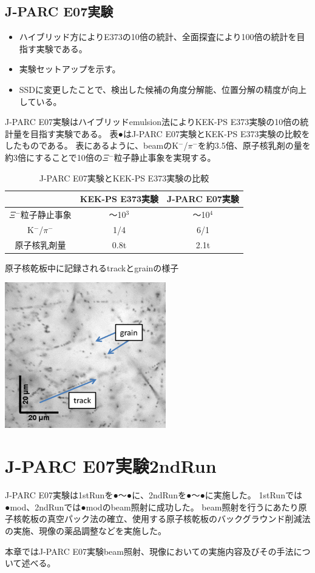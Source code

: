 \documentclass[12pt,a4paper]{jarticle}
\begin{document}
\subsection{J-PARC E07実験}
\begin{itemize}
    \item ハイブリッド方によりE373の10倍の統計、全面探査により100倍の統計を目指す実験である。
    \item 実験セットアップを示す。
    \item SSDに変更したことで、検出した候補の角度分解能、位置分解の精度が向上している。
\end{itemize}
J-PARC E07実験はハイブリッドemulsion法によりKEK-PS E373実験の10倍の統計量を目指す実験である。
表●はJ-PARC E07実験とKEK-PS E373実験の比較をしたものである。
表にあるように、beamのK$^-$/$\pi$$^-$を約3.5倍、原子核乳剤の量を約3倍にすることで10倍の$\Xi$$^-$粒子静止事象を実現する。
\begin{table}[htbp]
\centering
\caption{J-PARC E07実験とKEK-PS E373実験の比較\label{tab:compare_E07_E373}}
\begin{tabular}{c|c|c}
　　　&KEK-PS E373実験&J-PARC E07実験\\
\hline
\hline
$\Xi$$^-$粒子静止事象 & ～10$^3$    & ～10$^4$  \\
K$^-$/$\pi$$^-$ & 1/4  & 6/1 \\
原子核乳剤量 & 0.8t & 2.1t  \\
\hline
\end{tabular}
\end{table}
\begin{table}[htbp]
\centering
\caption{原子核乾板中に記録されるtrackとgrainの様子\label{tab:grain_track}}
\begin{center}
    \includegraphics[width=70mm]{grainfog.png}
\end{center}
\end{table}


\newpage
\section{J-PARC E07実験2ndRun}
J-PARC E07実験は1stRunを●～●に、2ndRunを●～●に実施した。
1stRunでは●mod、2ndRunでは●modのbeam照射に成功した。
beam照射を行うにあたり原子核乾板の真空パック法の確立、使用する原子核乾板のバックグラウンド削減法の実施、現像の薬品調整などを実施した。
\par
本章ではJ-PARC E07実験beam照射、現像においての実施内容及びその手法について述べる。
\end{document}
